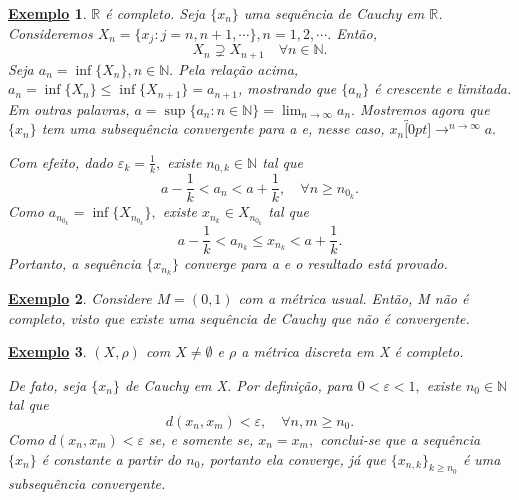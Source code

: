 \documentclass{article}
\newtheorem{example}{\underline{Exemplo}}
\begin{document}
\begin{example}
  \(\mathbb{R}\) é completo. Seja \(\{x_{n}\}\) uma sequência de Cauchy em \(\mathbb{R}\). Consideremos \(X_{n}= \{x_{j}:j = n, n + 1, \cdots\}, n = 1, 2, \cdots\).
Então, 
  \[
    X_{n} \supsetneq{X_{n+1}}\quad \forall n\in \mathbb{N}.
  \]
  Seja \(a_{n} = \inf\{X_{n}\}, n\in \mathbb{N}.\) Pela relação acima, \(a_{n} = \inf\{X_{n}\}\leq \inf\{X_{n+1}\} = a_{n+1}\), mostrando que \(\{a_{n}\}\) é crescente e 
limitada. Em outras palavras, \(a = \sup\{a_{n}: n\in \mathbb{N}\} = \lim_{n\to \infty}a_{n}.\)
  Mostremos agora que \(\{x_{n}\}\) tem uma subsequência convergente para a e, nesse caso, \(x_{n}\overbracket[0pt]{\longrightarrow}^{n\to \infty}a.\)

  Com efeito, dado \(\varepsilon_{k} = \frac{1}{k},\) existe \(n_{0, k}\in \mathbb{N}\) tal que 
  \[
  a-\frac{1}{k} < a_{n} < a + \frac{1}{k},\quad \forall n\geq n_{0_{k}}.
  \]
Como \(a_{n_{0_{k}}}=\inf\{X_{n_{0_{k}}}\},\) existe \(x_{n_{k}}\in X_{n_{0_{k}}}\) tal que 
  \[
    a - \frac{1}{k} < a_{n_{k}}\leq x_{n_{k}} < a + \frac{1}{k}.
  \]
  Portanto, a sequência \(\{x_{n_{k}}\}\) converge para a e o resultado está provado. 
\end{example}
\begin{example}
  Considere \(M = (0, 1)\) com a métrica usual. Então, M não é completo, visto que existe uma sequência de Cauchy que não é convergente.
\end{example}
\begin{example}
  \((X, \rho )\) com \(X \neq\emptyset\) e \(\rho \) a métrica discreta em X é completo. 

  De fato, seja \(\{x_{n}\}\) de Cauchy em X. Por definição, para \(0 < \varepsilon < 1,\) existe \(n_{0}\in \mathbb{N}\) tal que  
  \[
    d(x_{n}, x_{m}) < \varepsilon, \quad \forall n,m\geq n_{0}.
  \]
Como \(d(x_{n}, x_{m}) < \varepsilon \) se, e somente se, \(x_{n} = x_{m},\) conclui-se que a sequência \(\{x_{n}\}\) é constante a partir do \(n_{0}\),
portanto ela converge, já que \(\{x_{n, k}\}_{k\geq n_{0}}\) é uma subsequência convergente.
\end{example}
\end{document}
